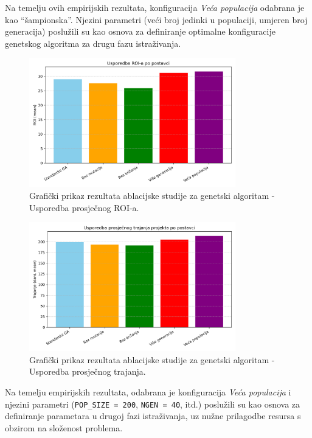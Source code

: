 Na temelju ovih empirijskih rezultata, konfiguracija \emph{Veća populacija} odabrana je kao ``šampionska''. Njezini parametri (veći broj jedinki u populaciji, umjeren broj generacija) poslužili su kao osnova za definiranje optimalne konfiguracije genetskog algoritma za drugu fazu istraživanja.

\begin{figure}[H]
        \centering
        \includegraphics[width=0.8\textwidth]{slike/ga_usporedba_roi.png}
        \caption{Grafički prikaz rezultata ablacijske studije za genetski algoritam - Usporedba prosječnog ROI-a.}
        \label{fig:ga_roi}
\end{figure}
    \begin{figure}[H]
        \centering
        \includegraphics[width=0.8\textwidth]{slike/ga_usporedba_trajanje.png}
        \caption{Grafički prikaz rezultata ablacijske studije za genetski algoritam - Usporedba prosječnog trajanja.}
        \label{fig:ga_trajanje}
\end{figure}

Na temelju empirijskih rezultata, odabrana je konfiguracija \emph{Veća populacija} i njezini parametri (\texttt{POP\_SIZE = 200}, \texttt{NGEN = 40}, itd.) poslužili su kao osnova za definiranje parametara u drugoj fazi istraživanja, uz nužne prilagodbe resursa s obzirom na složenost problema.

